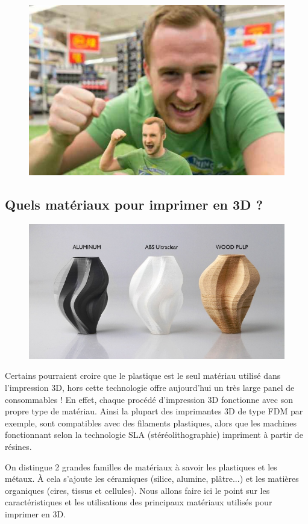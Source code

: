 \documentclass{article}
\begin{document}
\begin{figure}[h!]
\centering
\includegraphics[scale=0.4]{./images/figurine-scannee.png}
\end{figure}\hfill 
\newpage

\subsection{Quels matériaux pour imprimer en 3D ?}


\begin{figure}[h!]
\centering
\includegraphics[scale=0.4]{./images/materiaux-impression.png}
\end{figure}\hfill

Certains pourraient croire que le plastique est le seul matériau utilisé dans l'impression 3D, hors cette technologie offre aujourd'hui un très large panel de consommables ! En effet, chaque procédé d'impression 3D fonctionne avec son propre type de matériau. Ainsi la plupart des imprimantes 3D de type FDM par exemple, sont compatibles avec des filaments plastiques, alors que les machines fonctionnant selon la technologie SLA (stéréolithographie) impriment à partir de résines. \hfill 
 \par\leavevmode\par
On distingue 2 grandes familles de matériaux à savoir les plastiques et les métaux. À cela s'ajoute les céramiques (silice, alumine, plâtre...) et les matières organiques (cires, tissus et cellules). Nous allons faire ici le point sur les caractéristiques et les utilisations des principaux matériaux utilisés pour imprimer en 3D.
\end{document}
